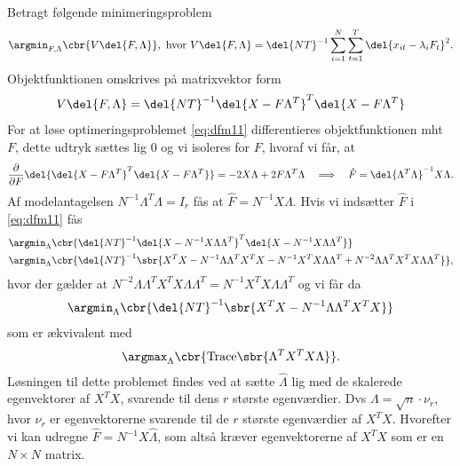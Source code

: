 Betragt følgende minimeringsproblem
\begin{align}
\argmin_{F, \Lambda} \cbr{V \del{F, \Lambda}}, \text{ hvor } V \del{F, \Lambda} = \del{NT}^{-1} \sum_{i=1}^N \sum_{t=1}^T \del{x_{it} -\lambda_i F_t}^2. \label{eq:dfm11}
\end{align}
Objektfunktionen omskrives på matrixvektor form
\begin{align*}
V \del{F, \Lambda} = \del{NT}^{-1} \del{X - F \Lambda^T}^T \del{X - F \Lambda^T}
\end{align*}
For at løse optimeringsproblemet \eqref{eq:dfm11} differentieres objektfunktionen mht \(F\), dette udtryk sættes lig 0 og vi isoleres for \(F\), hvoraf vi får, at
\begin{align*}
\frac{\partial}{\partial F} \del{\del{X - F \Lambda^T}^T \del{X - F \Lambda^T}} = -2 X \Lambda + 2 F \Lambda^T \Lambda \quad \Longrightarrow \quad \hat{F} = \del{\Lambda^T \Lambda}^{-1} X \Lambda.
\end{align*}
Af modelantagelsen \( N^{-1} \Lambda^T \Lambda = I_r\) fås at \(\hat{F} = N^{-1} X \Lambda\).
Hvis vi indsætter \(\hat{F}\) i \eqref{eq:dfm11} fås
\begin{align*}
&\argmin_\Lambda \cbr{\del{NT}^{-1} \del{X - N^{-1} X \Lambda \Lambda^T}^T \del{X - N^{-1} X \Lambda \Lambda^T}} \\
&\argmin_\Lambda \cbr{\del{NT}^{-1} \sbr{X^T X - N^{-1} \Lambda \Lambda^T X^T X - N^{-1} X^T X \Lambda \Lambda^T + N^{-2} \Lambda \Lambda^T X^T X \Lambda \Lambda^T}},
\end{align*}
hvor der gælder at \(N^{-2} \Lambda \Lambda^T X^T X \Lambda \Lambda^T = N^{-1} X^T X \Lambda \Lambda^T\) og vi får da
\begin{align*}
\argmin_\Lambda \cbr{\del{NT}^{-1} \sbr{X^T X - N^{-1} \Lambda \Lambda^T X^T X}}
\end{align*}
som er ækvivalent med
\begin{align*}
\argmax_\Lambda \cbr{ \text{Trace} \sbr{\Lambda^T X^T X \Lambda}}.
\end{align*}
Løsningen til dette problemet findes ved at sætte \(\hat{\Lambda}\) lig med de skalerede egenvektorer af \(X^T X\), svarende til dens \(r\) største egenværdier.
Dvs \(\Lambda = \sqrt{n} \cdot \nu_r\), hvor \(\nu_r\) er egenvektorerne svarende til de \(r\) største egenværdier af \(X^T X\).
Hvorefter vi kan udregne \(\hat{F} = N^{-1} X \hat{\Lambda}\), som altså kræver egenvektorerne af \(X^T X\) som er en \(N \times N\) matrix.

